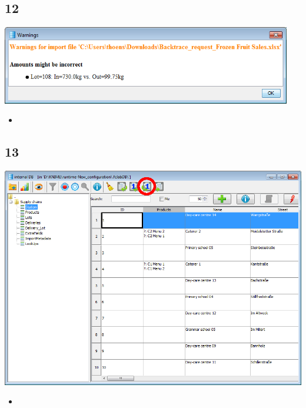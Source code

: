 \documentclass{beamer}
\begin{document}
\subsection{12}
\begin{frame}
	\begin{center}
  		\includegraphics[width=0.95\textwidth]{12.png}
	\end{center}
	\begin{itemize}
		\item
	\end{itemize}
\end{frame}

\subsection{13}
\begin{frame}
	\begin{center}
  		\includegraphics[height=0.6\textheight]{13.png}
	\end{center}
	\begin{itemize}
		\item
	\end{itemize}
\end{frame}
\end{document}
